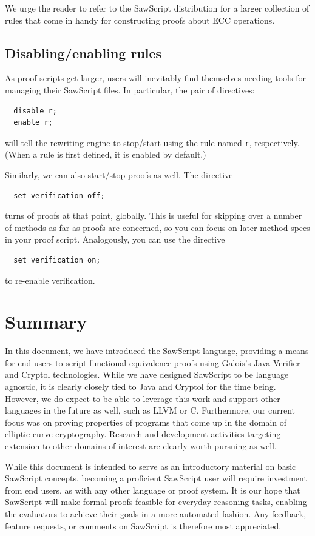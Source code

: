 \documentclass[12pt]{galois-whitepaper}
\newcommand{\sawScript}{{\sc SawScript}\xspace}
\begin{document}
We urge the reader to refer to the \sawScript distribution for a larger collection of rules that come in handy
for constructing proofs about ECC operations.

\subsection{Disabling/enabling rules}
As proof scripts get larger, users will inevitably find themselves needing tools for managing their \sawScript files.
In particular, the pair of directives:
\begin{Verbatim}
  disable r;
  enable r;
\end{Verbatim}
will tell the rewriting engine to stop/start using the rule named {\tt r}, respectively.
(When a rule is first defined, it is enabled by default.)

Similarly, we can also start/stop proofs as well.  The directive
\begin{Verbatim}
  set verification off;
\end{Verbatim}
turns of proofs at that point, globally.
This is useful for skipping over a number of methods as far as proofs are concerned, so you can focus on later method specs in your proof
script. Analogously, you can use the directive
\begin{Verbatim}
  set verification on;
\end{Verbatim}
to re-enable verification.

\section{Summary}
In this document, we have introduced the \sawScript language, providing a means for end users to script functional equivalence proofs
using Galois's Java Verifier and Cryptol technologies. While we have designed \sawScript to be language agnostic, it is clearly
closely tied to Java and Cryptol for the time being. However, we do expect to be able to leverage this work and support other languages
in the future as well, such as LLVM or C. Furthermore, our current focus was on proving properties of programs that come up in the domain
of elliptic-curve cryptography. Research and development activities targeting extension to other domains of interest are clearly worth pursuing
as well.

While this document is intended to serve as an introductory material on basic \sawScript concepts, becoming a proficient \sawScript user will require
investment from end users, as with any other language or proof system. It is our hope that \sawScript will make formal proofs feasible for everyday
reasoning tasks, enabling the evaluators to achieve their goals in a more automated fashion. Any feedback, feature requests, or
comments on \sawScript is therefore most appreciated.
\newpage
\appendix
\end{document}
